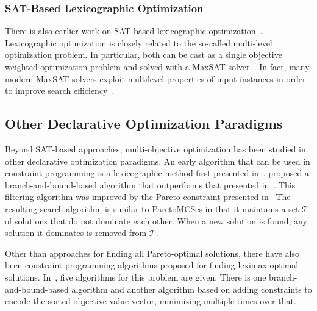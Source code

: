 \subsubsection{SAT-Based Lexicographic Optimization\label{sec:lex-opt}}

There is also earlier work on SAT-based lexicographic optimization~\autocites{DBLP:journals/ors/EhrgottG00,DBLP:conf/ijcai/ArgelichLS09,DBLP:journals/amai/Marques-SilvaAGL11}. 
Lexicographic optimization is closely related to the so-called multi-level optimization problem.
In particular, both can be cast as a single objective weighted optimization problem and solved with a MaxSAT solver~\autocites{DBLP:conf/ijcai/ArgelichLS09,DBLP:journals/amai/Marques-SilvaAGL11}.
In fact, many modern MaxSAT solvers exploit multilevel properties of input instances in order to improve search efficiency~\autocites{DBLP:conf/vmcai/PaxianRB21,DBLP:conf/cp/AnsoteguiBGL12}.

\subsection{Other Declarative Optimization Paradigms\label{sec:other-approaches}}

Beyond SAT-based approaches, multi-objective optimization has been studied in other declarative optimization paradigms.
An early algorithm that can be used in constraint programming is a lexicographic method first presented in~\textcite{Wassenhove1980}.
\Textcite{DBLP:conf/ecai/Gavanelli02} proposed a branch-and-bound-based algorithm that outperforms that presented in~\textcite{Wassenhove1980}.
This filtering algorithm was improved by the Pareto constraint presented in~\textcite{DBLP:conf/cp/SchausH13,DBLP:conf/aaai/HartertS14}
The resulting search algorithm is similar to ParetoMCSes in that it maintains a set $\mathcal{T}$ of solutions that do not dominate each other.
When a new solution is found, any solution it dominates is removed from $\mathcal{T}$.

Other than approaches for finding all Pareto-optimal solutions, there have also been constraint programming algorithms proposed for finding leximax-optimal solutions.
In~\textcite{DBLP:journals/ai/BouveretL09}, five algorithms for this problem are given.
There is one branch-and-bound-based algorithm and another algorithm based on adding constraints to encode the sorted objective value vector, minimizing multiple times over that.

